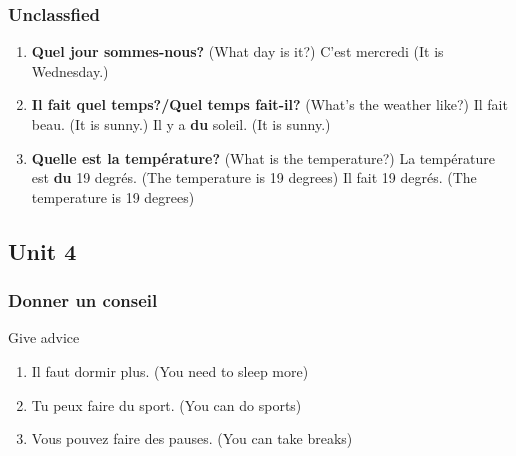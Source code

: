 \documentclass[10pt,a4paper,twoside]{article} %
\begin{document}
\subsubsection*{Unclassfied}
\begin{enumerate}
    \item \textbf{Quel jour sommes-nous?} (What day is it?) \newline
    C'est mercredi (It is Wednesday.)
    \item \textbf{Il fait quel temps?/Quel temps fait-il?} (What's the weather like?) \newline
    Il fait beau. (It is sunny.) \newline
    Il y a \textbf{du} soleil. (It is sunny.)
    \item \textbf{Quelle est la température?} (What is the temperature?) \newline
    La température est \textbf{du} 19 degrés. (The temperature is 19 degrees) \newline
    Il fait 19 degrés. (The temperature is 19 degrees)
\end{enumerate}

\subsection*{Unit 4}
\subsubsection*{Donner un conseil}
\begin{center}
    Give advice
\end{center}
\begin{enumerate}
    \item Il faut dormir plus. (You need to sleep more)
    \item Tu peux faire du sport. (You can do sports)
    \item Vous pouvez faire des pauses. (You can take breaks)
\end{enumerate}
\end{document}
